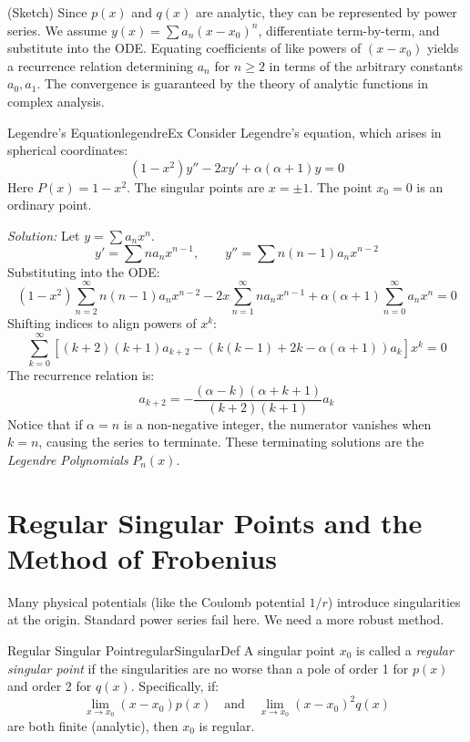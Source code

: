 \documentclass{book}
\newenvironment{Proof}[1][]
  {\begin{ProofTcb}[#1]}
  {\end{ProofTcb}}
\begin{document}
\begin{Proof}
    (Sketch) Since $p(x)$ and $q(x)$ are analytic, they can be represented by power series. We assume $y(x) = \sum a_n (x-x_0)^n$, differentiate term-by-term, and substitute into the ODE. Equating coefficients of like powers of $(x-x_0)$ yields a recurrence relation determining $a_n$ for $n \ge 2$ in terms of the arbitrary constants $a_0, a_1$. The convergence is guaranteed by the theory of analytic functions in complex analysis.
\end{Proof}

\begin{example}{Legendre's Equation}{legendreEx}
    Consider Legendre's equation, which arises in spherical coordinates:
    \[
        (1-x^2)y'' - 2xy' + \alpha(\alpha+1)y = 0
    \]
    Here $P(x) = 1-x^2$. The singular points are $x = \pm 1$. The point $x_0 = 0$ is an ordinary point.

    \emph{Solution:} Let $y = \sum a_n x^n$.
    \[
        y' = \sum n a_n x^{n-1}, \qquad y'' = \sum n(n-1)a_n x^{n-2}
    \]
    Substituting into the ODE:
    \[
        (1-x^2)\sum_{n=2}^\infty n(n-1)a_n x^{n-2} - 2x \sum_{n=1}^\infty n a_n x^{n-1} + \alpha(\alpha+1)\sum_{n=0}^\infty a_n x^n = 0
    \]
    Shifting indices to align powers of $x^k$:
    \[
        \sum_{k=0}^\infty \left[ (k+2)(k+1)a_{k+2} - (k(k-1) + 2k - \alpha(\alpha+1))a_k \right] x^k = 0
    \]
    The recurrence relation is:
    \[
        a_{k+2} = -\frac{(\alpha - k)(\alpha + k + 1)}{(k+2)(k+1)} a_k
    \]
    Notice that if $\alpha = n$ is a non-negative integer, the numerator vanishes when $k=n$, causing the series to terminate. These terminating solutions are the \emph{Legendre Polynomials} $P_n(x)$.
\end{example}

\section{Regular Singular Points and the Method of Frobenius}

Many physical potentials (like the Coulomb potential $1/r$) introduce singularities at the origin. Standard power series fail here. We need a more robust method.

\begin{defn}{Regular Singular Point}{regularSingularDef}
    A singular point $x_0$ is called a \emph{regular singular point} if the singularities are no worse than a pole of order 1 for $p(x)$ and order 2 for $q(x)$. Specifically, if:
    \[
        \lim_{x \to x_0} (x-x_0)p(x) \quad \text{and} \quad \lim_{x \to x_0} (x-x_0)^2 q(x)
    \]
    are both finite (analytic), then $x_0$ is regular.
\end{defn}
\end{document}

